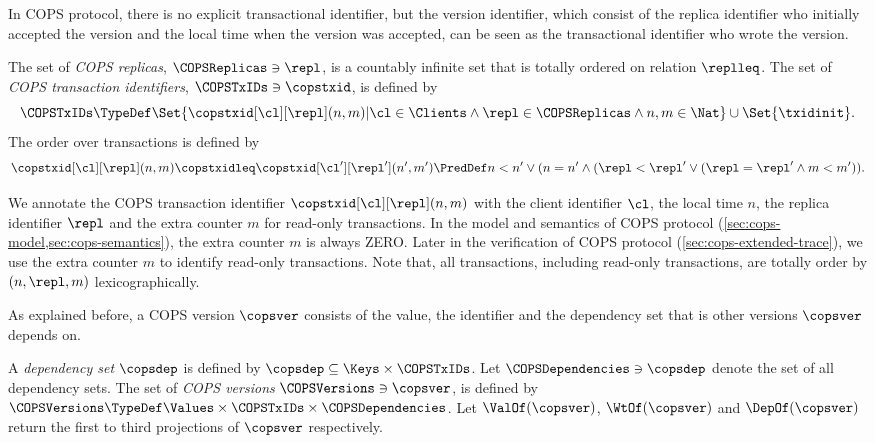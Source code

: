 In COPS protocol, there is no explicit transactional identifier,
but the version identifier,
which consist of the replica identifier who initially accepted the version 
and the local time when the version was accepted,
can be seen as the transactional identifier who wrote the version.

\begin{definition}
The set of \emph{COPS replicas}, \( \COPSReplicas \ni \repl \), 
is a countably infinite set that is totally ordered on relation \( \replleq \).
The set of \emph{COPS transaction identifiers}, \( \COPSTxIDs \ni \copstxid \),
is defined by
\[ 
    \COPSTxIDs \TypeDef \Set{\copstxid[\cl][\repl](n,m) | 
    \cl \in \Clients \land \repl \in \COPSReplicas \land n,m \in \Nat } \cup \Set{\txidinit}.
\]
The order over transactions is defined by
\[ 
\copstxid[\cl][\repl](n,m) \copstxidleq \copstxid[\cl'][\repl'](n',m')
\PredDef n < n' \lor ( n = n' \land ( \repl < \repl' \lor ( \repl = \repl' \land m < m' ) ) .
\]
\end{definition}

We annotate the COPS transaction identifier \(\copstxid[\cl][\repl](n,m)  \)
with the client identifier \( \cl \), the local time \(n\),
the replica identifier \( \repl \)
and the extra counter \( m \) for read-only transactions.
In the model and semantics of COPS protocol (\cref{sec:cops-model,sec:cops-semantics}), 
the extra counter \(m\) is always ZERO.
Later in the verification of COPS protocol (\cref{sec:cops-extended-trace}),
we use the extra counter \( m \) to identify read-only transactions.
Note that, all transactions, including read-only transactions,
are totally order by \( (n,\repl,m) \) lexicographically.

As explained before,
a COPS version \( \copsver \) consists of the value, the identifier 
and the dependency set that is other versions \( \copsver \) depends on.

\begin{definition}
A \emph{dependency set} \( \copsdep \) 
is defined by \( \copsdep \subseteq \Keys \times \COPSTxIDs \).
Let \( \COPSDependencies \ni \copsdep \) denote the set of all dependency sets.
The set of \emph{COPS versions} \( \COPSVersions \ni \copsver \), is defined by 
\( \COPSVersions \TypeDef \Values \times \COPSTxIDs  \times \COPSDependencies \).
Let \(\ValOf(\copsver)\), \(\WtOf(\copsver)\)  
and \( \DepOf(\copsver)\) return the first to third projections of \( \copsver \) respectively.
\end{definition}

